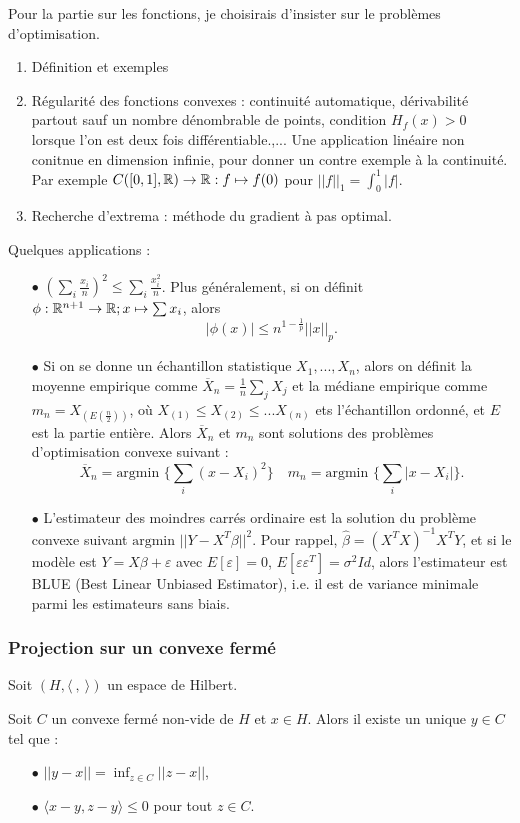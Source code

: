 Pour la partie sur les fonctions, je choisirais d'insister sur le problèmes d'optimisation. 
\begin{enumerate}
\item Définition et exemples
\item Régularité des fonctions convexes : continuité automatique, dérivabilité partout sauf un nombre dénombrable de points, condition $H_f(x)>0$ lorsque l'on est deux fois différentiable.,... Une application linéaire non conitnue en dimension infinie, pour donner un contre exemple à la continuité. Par exemple $C([0,1],\mathbb R)\rightarrow \mathbb R : f\mapsto f(0)$ pour $||f||_1=\int_0^1 |f| $.
\item Recherche d'extrema : méthode du gradient à pas optimal.
\end{enumerate}
Quelques applications :
\begin{itemize}
\item[$\bullet$] $ (\sum_i \frac{x_i}{n})^2 \leq \sum_i \frac{x_i^2}{n} $. Plus généralement, si on définit $\phi : \mathbb R^{n+1}\rightarrow \mathbb R ; x\mapsto \sum x_i$, alors \[|\phi(x)|\leq n^{1-\frac{1}{p}} ||x||_p.\]
\item[$\bullet$] Si on se donne un échantillon statistique $X_1,..., X_n$, alors on définit la moyenne empirique comme $\overline X_n = \frac{1}{n}\sum_j X_j$ et la médiane empirique comme $m_n = X_{(E(\frac{n}{2}))}$, où $X_{(1)} \leq X_{(2)} \leq ... X_{(n)}$ ets l'échantillon ordonné, et $E$ est la partie entière. Alors $\overline X_n$ et $m_n$ sont solutions des problèmes d'optimisation convexe suivant :
\[\overline X_n = \text{argmin } \{ \sum_i (x-X_i)^2\} \quad m_n = \text{argmin }\{\sum_i |x-X_i|\}. \]
\item[$\bullet$] L'estimateur des moindres carrés ordinaire est la solution du problème convexe suivant $\text{argmin } ||Y - X^{T}\beta||^2$. Pour rappel, $\hat \beta = (X^T X)^{-1} X^T Y$, et si le modèle est $Y = X\beta + \varepsilon$ avec $E[\varepsilon]=0$, $E[\varepsilon \varepsilon^T] = \sigma^2 Id$, alors l'estimateur est BLUE (Best Linear Unbiased Estimator), i.e. il est de variance minimale parmi les estimateurs sans biais.
\end{itemize}

\subsubsection{Projection sur un convexe fermé}
Soit $(H,\langle \ ,\ \rangle)$ un espace de Hilbert. 

\begin{thm}
Soit $C$ un convexe fermé non-vide de $H$ et $x\in H$. Alors il existe un unique $y\in C$ tel que :
\begin{itemize}
\item[$\bullet$] $||y-x|| = \inf_{z\in C}||z-x||$,
\item[$\bullet$] $\langle x-y,z-y \rangle \leq 0 $ pour tout $z\in C$.
\end{itemize}
\end{thm}

